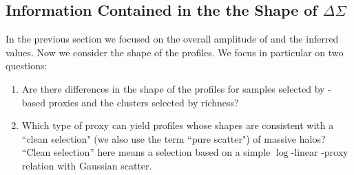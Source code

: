 \documentclass[fleqn,usenatbib,useAMS]{mnras}
\begin{document}
\begin{CJK*}{UTF8}{gbsn}
\subsection{Information Contained in the the Shape of \texorpdfstring{$\Delta\Sigma$}{DSigma}}
    \label{sec:mstar_vs_richness}

    In the previous section we focused on the overall amplitude of \dsigma{} and the inferred
    \sigmvir{} values. 
    Now we consider the shape of the \dsigma{} profiles. 
    We focus in particular on two questions:

    \begin{enumerate}

        \item Are there differences in the shape of the \dsigma{} profiles for samples selected by
            \mstar{}-based \mvir{} proxies and the clusters selected by richness?

        \item Which type of \mvir{} proxy can yield \dsigma{} profiles whose shapes are consistent
            with a ``clean selection" (we also use the term ``pure scatter") of massive halos? 
            ``Clean selection'' here means a selection based on a simple $\log$-linear \mvir{}-proxy 
            relation with Gaussian scatter.

    \end{enumerate}


\end{CJK*}
\end{document}
